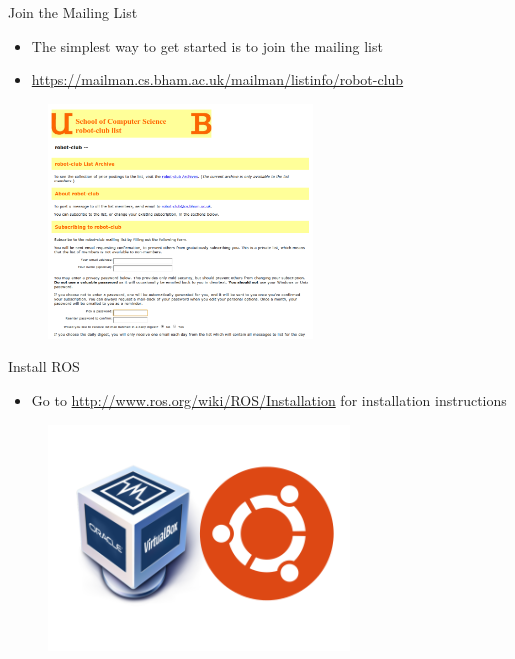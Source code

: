 \documentclass{beamer}
\begin{document}
\begin{frame}{Join the Mailing List}

  \begin{itemize}
  \item The simplest way to get started is to join the mailing list
  \item \url{https://mailman.cs.bham.ac.uk/mailman/listinfo/robot-club}
  \end{itemize}
  
  \begin{figure}
    \includegraphics[width=7cm]{mailinglist.png}
  \end{figure}

\end{frame}

\begin{frame}{Install ROS} 
 
  \begin{itemize}
  \item Go to \url{http://www.ros.org/wiki/ROS/Installation} for
    installation instructions
  \end{itemize}

  \begin{figure}
    \includegraphics[width=8cm]{os.png}
  \end{figure}

\end{frame}
\end{document}
